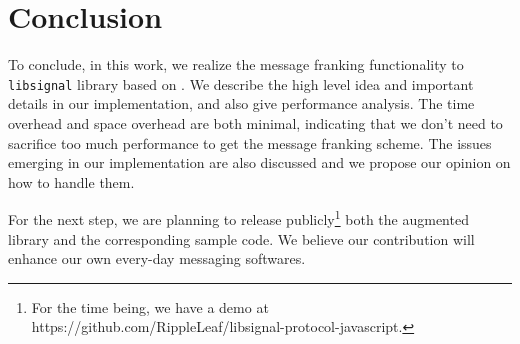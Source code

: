 
\section{Conclusion}
To conclude,
in this work, we realize the message franking functionality to \texttt{libsignal} library
based on \cite{grubbs_message_2017}.
We describe the high level idea and important details in our implementation,
and also give performance analysis. 
The time overhead and space overhead are both minimal, %
indicating that we don't need to sacrifice too much performance to get the message franking scheme.
The issues emerging in our implementation are also discussed and
we propose our opinion on how to handle them.

For the next step,
we are planning to release publicly\footnote{
For the time being, we have a demo at
https://github.com/RippleLeaf/libsignal-protocol-javascript.
} 
both the augmented library and the corresponding sample code.
We believe our contribution will 
enhance our own every-day messaging softwares.
